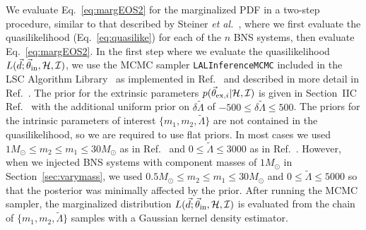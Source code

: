 \documentclass[twocolumn,prd,amssymb,aps,nofootinbib,showpacs,epsf]{revtex4}
\newcommand\les[2]{\textcolor{blue}{{#1}\sout{#2}}}
\begin{document}
We evaluate Eq.~\eqref{eq:margEOS2} for the marginalized PDF in a two-step procedure, similar to that described by Steiner {\it et al.}~\cite{SteinerLattimerBrown2010}, where we first evaluate the quasilikelihood (Eq.~\eqref{eq:quasilike}) for each of the $n$ BNS systems, then evaluate Eq.~\eqref{eq:margEOS2}. In the first step where we evaluate the quasilikelihood $L(\vec d; \vec\theta_{\rm in}, \mathcal{H}, \mathcal{I})$, we use the MCMC sampler \texttt{LALInferenceMCMC} included in the LSC Algorithm Library~\cite{lal} as implemented in Ref.~\cite{WadeCreightonOchsner2014} and described in more detail in Ref.~\cite{VeitchRaymondFarr2014}. The prior for the extrinsic parameters $p(\vec\theta_{{\rm ex,}i} | \mathcal{H}, \mathcal{I})$ is given in Section~IIC Ref.~\cite{VeitchRaymondFarr2014} with the additional uniform prior on $\delta\tilde\Lambda$ of $-500 \le \delta\tilde\Lambda \le 500$. The priors for the intrinsic parameters of interest $\{m_{1}, m_{2}, \tilde\Lambda\}$ are not contained in the quasilikelihood, so we are required to use flat priors. In most cases we used $1M_\odot \le m_2 \le m_1 \le 30M_\odot$ as in Ref.~\cite{VeitchRaymondFarr2014} and $0 \le \tilde\Lambda \le 3000$ as in Ref.~\cite{WadeCreightonOchsner2014}. However, when we injected BNS systems with component masses of $1M_\odot$ in Section~\ref{sec:varymass}, we used $0.5M_\odot \le m_2 \le m_1 \le 30M_\odot$ and $0 \le \tilde\Lambda \le 5000$ so that the posterior was minimally affected by the prior. After running the MCMC sampler, the marginalized distribution $L(\vec d; \vec\theta_{\rm in}, \mathcal{H}, \mathcal{I})$ is evaluated from the chain of $\{m_{1}, m_{2}, \tilde\Lambda\}$ samples with a Gaussian kernel density estimator.

\end{document}
